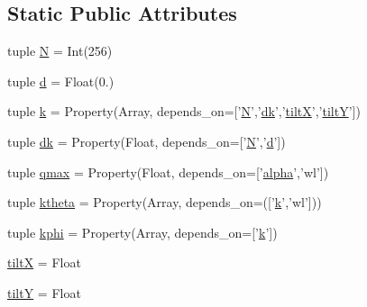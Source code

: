 \subsection*{Static Public Attributes}
\begin{DoxyCompactItemize}
\item 
tuple \hyperlink{classaberrations_1_1_aberrations_a23ac1b59d9bd82141c9e3bc838ede16e}{N} = Int(256)
\item 
tuple \hyperlink{classaberrations_1_1_aberrations_a24b6f1c8db4c40bf846990969118e494}{d} = Float(0.)
\item 
tuple \hyperlink{classaberrations_1_1_aberrations_a5f63dc7f3be647efe0273e85365be295}{k} = Property(Array, depends\-\_\-on=\mbox{[}'\hyperlink{classaberrations_1_1_aberrations_a23ac1b59d9bd82141c9e3bc838ede16e}{N}','\hyperlink{classaberrations_1_1_aberrations_a2ca713e45b3e4a8eb7c8404922ca6d7b}{dk}','\hyperlink{classaberrations_1_1_aberrations_a3f1b6bd8c0303bc4c01c49e401c4672d}{tilt\-X}','\hyperlink{classaberrations_1_1_aberrations_ad6443a723b0a30fe7410f7732794c9a1}{tilt\-Y}'\mbox{]})
\item 
tuple \hyperlink{classaberrations_1_1_aberrations_a2ca713e45b3e4a8eb7c8404922ca6d7b}{dk} = Property(Float, depends\-\_\-on=\mbox{[}'\hyperlink{classaberrations_1_1_aberrations_a23ac1b59d9bd82141c9e3bc838ede16e}{N}','\hyperlink{classaberrations_1_1_aberrations_a24b6f1c8db4c40bf846990969118e494}{d}'\mbox{]})
\item 
tuple \hyperlink{classaberrations_1_1_aberrations_ae3e3b86e644ce0a655802264fe091a34}{qmax} = Property(Float, depends\-\_\-on=\mbox{[}'\hyperlink{virtual_goniometer_8m_a62197192f0fbf4e0675eb37be1c4c175}{alpha}','wl'\mbox{]})
\item 
tuple \hyperlink{classaberrations_1_1_aberrations_aafc218cbf4027b922fd2d681a90acae2}{ktheta} = Property(Array, depends\-\_\-on=(\mbox{[}'\hyperlink{classaberrations_1_1_aberrations_a5f63dc7f3be647efe0273e85365be295}{k}','wl'\mbox{]}))
\item 
tuple \hyperlink{classaberrations_1_1_aberrations_a925844b4d0d329bb014f28b66ab53d44}{kphi} = Property(Array, depends\-\_\-on=\mbox{[}'\hyperlink{classaberrations_1_1_aberrations_a5f63dc7f3be647efe0273e85365be295}{k}'\mbox{]})
\item 
\hyperlink{classaberrations_1_1_aberrations_a3f1b6bd8c0303bc4c01c49e401c4672d}{tilt\-X} = Float
\item 
\hyperlink{classaberrations_1_1_aberrations_ad6443a723b0a30fe7410f7732794c9a1}{tilt\-Y} = Float
\item 

\end{DoxyCompactItemize}

